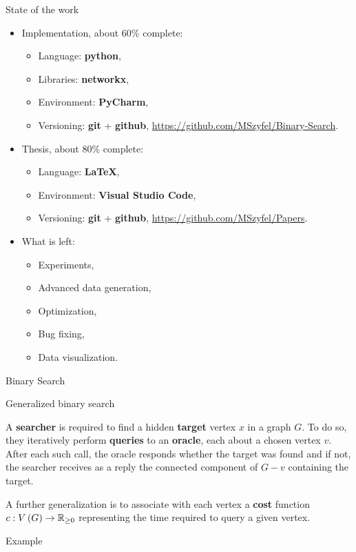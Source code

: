 \begin{frame}{State of the work}
    \begin{itemize}
        \item Implementation, about 60\% complete:
        \begin{itemize}
        \item Language: \textbf{python},
        \item Libraries: \textbf{networkx},
        \item Environment: \textbf{PyCharm},
        \item Versioning: \textbf{git} + \textbf{github}, \hyperlink{https://github.com/MSzyfel/Binary-Search}{https://github.com/MSzyfel/Binary-Search}.
        \end{itemize} 
        \pause
        \item Thesis, about 80\% complete:
        \begin{itemize}
            \item Language: \textbf{LaTeX},
            \item Environment: \textbf{Visual Studio Code},
            \item Versioning: \textbf{git} + \textbf{github}, \hyperlink{https://github.com/MSzyfel/Papers}{https://github.com/MSzyfel/Papers}.
        \end{itemize} 
        \pause
        \item What is left: 
        \begin{itemize}
            \item Experiments,
            \item Advanced data generation,
            \item Optimization,
            \item Bug fixing,
            \item Data visualization.
        \end{itemize} 
    \end{itemize}
\end{frame}
\begin{frame}{Binary Search}
    
\end{frame}


\begin{frame}{Generalized binary search}
        \begin{definition} A \textbf{searcher} is required to find a hidden \textbf{target} vertex $x$ in a graph $G$. To do so, they iteratively perform \textbf{queries} to an \textbf{oracle}, each about a chosen vertex $v$. After each such call, the oracle responds whether the target was found and if not, the searcher receives as a reply the connected component of $G-v$ containing the target.
        \end{definition}
	\pause

	A further generalization is to associate with each vertex a \textbf{cost} function $c:V\left( G \right)\to \mathbb{R}_{\geq 0}$ representing the time required to query a given vertex. 
    
\end{frame}
\begin{frame}{Example}
    
\end{frame}


